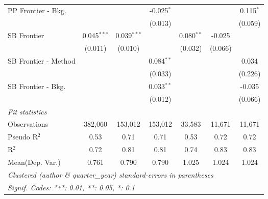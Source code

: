 \begin{tabular}{lcccccc}
   PP Frontier - Bkg.   &               &               & -0.025$^{*}$  &               &              & 0.115$^{*}$\\   
                        &               &               & (0.013)       &               &              & (0.059)\\   
   SB Frontier          & 0.045$^{***}$ & 0.039$^{***}$ &               & 0.080$^{**}$  & -0.025       &   \\   
                        & (0.011)       & (0.010)       &               & (0.032)       & (0.066)      &   \\   
   SB Frontier - Method &               &               & 0.084$^{**}$  &               &              & 0.034\\   
                        &               &               & (0.033)       &               &              & (0.226)\\   
   SB Frontier - Bkg.   &               &               & 0.033$^{**}$  &               &              & -0.035\\   
                        &               &               & (0.012)       &               &              & (0.066)\\   
   \midrule
   \emph{Fit statistics}\\
   Observations         & 382,060       & 153,012       & 153,012       & 33,583        & 11,671       & 11,671\\  
   Pseudo R$^2$         & 0.53          & 0.71          & 0.71          & 0.53          & 0.72         & 0.72\\  
   R$^2$                & 0.72          & 0.81          & 0.81          & 0.74          & 0.83         & 0.83\\  
Mean(Dep. Var.) & 0.761 & 0.790 & 0.790 & 1.025 & 1.024 & 1.024 \\
   \midrule \midrule
   \multicolumn{7}{l}{\emph{Clustered (author \& quarter\_year) standard-errors in parentheses}}\\
   \multicolumn{7}{l}{\emph{Signif. Codes: ***: 0.01, **: 0.05, *: 0.1}}\\
\end{tabular}
\par\endgroup
